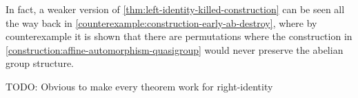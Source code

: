 \begin{remark}
    In fact, a weaker version of \autoref{thm:left-identity-killed-construction} can be seen all the way back in \autoref{counterexample:construction-early-ab-destroy}, where by counterexample it is shown that there are permutations where the construction in \autoref{construction:affine-automorphism-quasigroup} would never preserve the abelian group structure.
\end{remark}

TODO: Obvious to make every theorem work for right-identity